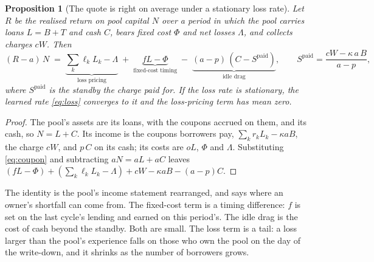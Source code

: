 \documentclass[10pt,a4paper]{article}
\newtheorem{proposition}{Proposition}
\theoremstyle{remark}
\begin{document}
\begin{proposition}[The quote is right on average under a stationary loss rate]
\label{prop:fair}
Let \(R\) be the realised return on pool capital \(N\) over a period in which
the pool carries loans \(L=B+T\) and cash \(C\), bears fixed cost \(\Phi\) and
net losses \(\Lambda\), and collects charges \(cW\). Then
\begin{equation}
(R-a)\,N \;=\; \underbrace{\textstyle\sum_k \ell_k L_k-\Lambda}_{\text{loss pricing}}
\;+\;\underbrace{fL-\Phi}_{\text{fixed-cost timing}}
\;-\;\underbrace{(a-p)\,(C-S^{\mathrm{paid}})}_{\text{idle drag}},
\qquad S^{\mathrm{paid}}=\frac{cW-\kappa\,a\,B}{a-p},
\label{eq:identity}
\end{equation}
where \(S^{\mathrm{paid}}\) is the standby the charge paid for. If the loss
rate is stationary, the learned rate \eqref{eq:loss} converges to it and the
loss-pricing term has mean zero.
\end{proposition}
\begin{proof}
The pool's assets are its loans, with the coupons accrued on them, and its cash,
so \(N=L+C\). Its income is the
coupons borrowers pay, \(\sum_k r_kL_k-\kappa aB\), the charge \(cW\), and
\(p\,C\) on its cash; its costs are \(oL\), \(\Phi\) and \(\Lambda\).
Substituting \eqref{eq:coupon} and subtracting \(aN=aL+aC\) leaves
\((fL-\Phi)+(\sum_k\ell_kL_k-\Lambda)+cW-\kappa aB-(a-p)C\).
\end{proof}
The identity is the pool's income statement rearranged, and says where an
owner's shortfall can come from. The fixed-cost term is a timing difference:
\(f\) is set on the last cycle's lending and earned on this period's. The
idle drag is the cost of cash beyond the standby. Both are small. The loss
term is a tail: a loss larger than the pool's experience falls on those
who own the pool on the day of the write-down, and it shrinks as the number
of borrowers grows.
\end{document}
